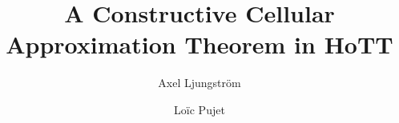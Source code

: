 \documentclass{easychair}
\title{A Constructive Cellular Approximation Theorem in HoTT}
\author{
Axel Ljungström\inst{1} \and Loïc Pujet\inst{1}}
\institute{
  {
  Stockholm University,
  Stockholm, Sweden
  }
 }
\begin{document}
\maketitle

\label{sect:bib}

%
%
%



\end{document}
